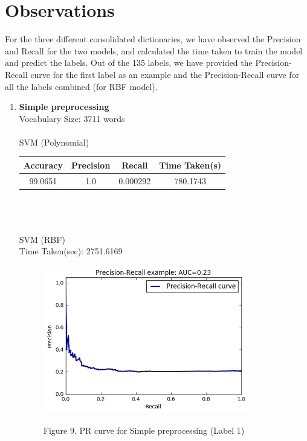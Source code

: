 \documentclass[fleqn,10pt]{SelfArx} %
\begin{document}
\section{Observations}
For the three different consolidated dictionaries, we have observed the Precision and Recall for the two models, and calculated the time taken to train the model and predict the labels. Out of the 135 labels, we have provided the Precision-Recall curve for the first label as an example and the Precision-Recall curve for all the labels combined (for RBF model).
\begin{enumerate}
\item \textbf{Simple preprocessing}
\\Vocabulary Size: 3711 words
\\\\SVM (Polynomial)
\\ \begin{tabular}{|c c c c|} 
\hline
Accuracy & Precision & Recall & Time Taken(s)\\ \hline
99.0651 & 1.0 & 0.000292 & 780.1743 \\ \hline
\end{tabular}
\\\\\\SVM (RBF)
\\Time Taken(sec): 2751.6169

\begin{figure}

\begin{minipage}[b]{1.0\linewidth}
  \centering
  \centerline{\includegraphics[width=9cm]{SampleGraphLabel1}}
  \centerline{Figure 9. PR curve for Simple preprocessing (Label 1)}\medskip
\end{minipage}


\end{figure}
\end{enumerate}
\end{document}
